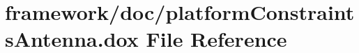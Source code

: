 \hypertarget{platform_constraints_antenna_8dox}{}\section{framework/doc/platform\+Constraints\+Antenna.dox File Reference}
\label{platform_constraints_antenna_8dox}
